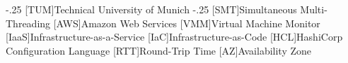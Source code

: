 \documentclass[headsepline,footsepline,footinclude=false,oneside,fontsize=11pt,paper=a4,listof=totoc,bibliography=totoc]{scrbook} %
\begin{document}


\frontmatter{}



%

\tableofcontents{}

\mainmatter{}

%








\appendix{}


\begin{acronym}
	\itemsep-.25\baselineskip
	[TUM]{Technical University of Munich}
	\itemsep-.25\baselineskip
	[SMT]{Simultaneous Multi-Threading}
	[AWS]{Amazon Web Services}
	[VMM]{Virtual Machine Monitor}
	[IaaS]{Infrastructure-as-a-Service}
	[IaC]{Infrastructure-as-Code}
	[HCL]{HashiCorp Configuration Language}
	[RTT]{Round-Trip Time}
	[AZ]{Availability Zone}
\end{acronym}

\printbibliography{}
\end{document}
